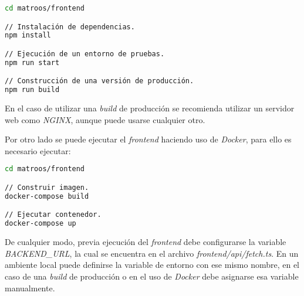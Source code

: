 \begin{lstlisting}[language=sh]
cd matroos/frontend

// Instalación de dependencias.
npm install

// Ejecución de un entorno de pruebas.
npm run start

// Construcción de una versión de producción.
npm run build
\end{lstlisting}

En el caso de utilizar una \textit{build} de producción se recomienda utilizar un servidor web como \textit{NGINX}, aunque puede usarse cualquier otro.

Por otro lado se puede ejecutar el \textit{frontend} haciendo uso de \textit{Docker}, para ello es necesario ejecutar:

\begin{lstlisting}[language=sh]
cd matroos/frontend

// Construir imagen.
docker-compose build

// Ejecutar contenedor.
docker-compose up
\end{lstlisting}

De cualquier modo, previa ejecución del \textit{frontend} debe configurarse la variable \textit{BACKEND\_URL}, la cual se encuentra en el archivo \textit{frontend/api/fetch.ts}. En un ambiente local puede definirse la variable de entorno con ese mismo nombre, en el caso de una \textit{build} de producción o en el uso de \textit{Docker} debe asignarse esa variable manualmente.
